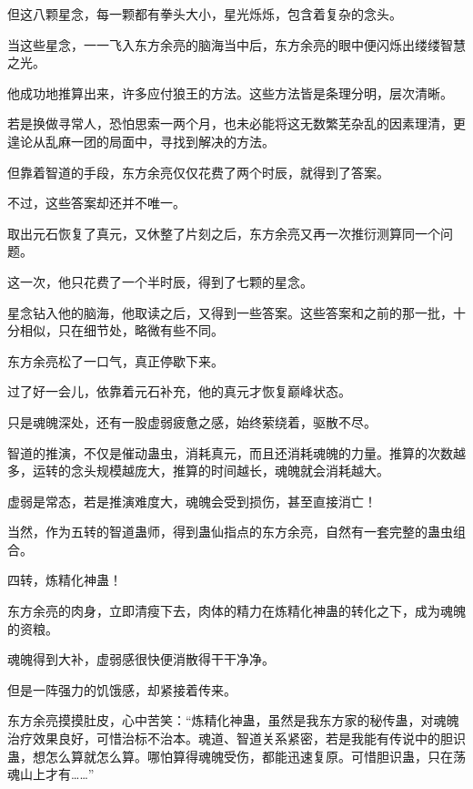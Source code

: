 \begin{this_body}
但这八颗星念，每一颗都有拳头大小，星光烁烁，包含着复杂的念头。

当这些星念，一一飞入东方余亮的脑海当中后，东方余亮的眼中便闪烁出缕缕智慧之光。

他成功地推算出来，许多应付狼王的方法。这些方法皆是条理分明，层次清晰。

若是换做寻常人，恐怕思索一两个月，也未必能将这无数繁芜杂乱的因素理清，更遑论从乱麻一团的局面中，寻找到解决的方法。

但靠着智道的手段，东方余亮仅仅花费了两个时辰，就得到了答案。

不过，这些答案却还并不唯一。

取出元石恢复了真元，又休整了片刻之后，东方余亮又再一次推衍测算同一个问题。

这一次，他只花费了一个半时辰，得到了七颗的星念。

星念钻入他的脑海，他取读之后，又得到一些答案。这些答案和之前的那一批，十分相似，只在细节处，略微有些不同。

东方余亮松了一口气，真正停歇下来。

过了好一会儿，依靠着元石补充，他的真元才恢复巅峰状态。

只是魂魄深处，还有一股虚弱疲惫之感，始终萦绕着，驱散不尽。

智道的推演，不仅是催动蛊虫，消耗真元，而且还消耗魂魄的力量。推算的次数越多，运转的念头规模越庞大，推算的时间越长，魂魄就会消耗越大。

虚弱是常态，若是推演难度大，魂魄会受到损伤，甚至直接消亡！

当然，作为五转的智道蛊师，得到蛊仙指点的东方余亮，自然有一套完整的蛊虫组合。

四转，炼精化神蛊！

东方余亮的肉身，立即清瘦下去，肉体的精力在炼精化神蛊的转化之下，成为魂魄的资粮。

魂魄得到大补，虚弱感很快便消散得干干净净。

但是一阵强力的饥饿感，却紧接着传来。

东方余亮摸摸肚皮，心中苦笑：“炼精化神蛊，虽然是我东方家的秘传蛊，对魂魄治疗效果良好，可惜治标不治本。魂道、智道关系紧密，若是我能有传说中的胆识蛊，想怎么算就怎么算。哪怕算得魂魄受伤，都能迅速复原。可惜胆识蛊，只在荡魂山上才有……”

\end{this_body}

